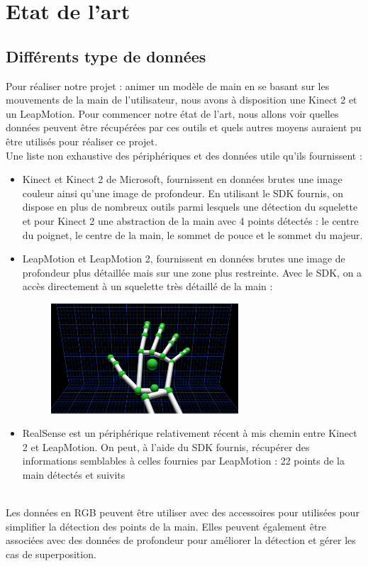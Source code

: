 \chapter{Etat de l'art}

\section{Différents type de données}
Pour réaliser notre projet : animer un modèle de main en se basant sur les mouvements de la main de l'utilisateur, nous avons à disposition une 
Kinect 2 et un LeapMotion. Pour commencer notre état de l'art, nous allons voir quelles données peuvent être récupérées par ces outils et 
quels autres moyens auraient pu être utilisés pour réaliser ce projet.\\

Une liste non exhaustive des périphériques et des données utile qu'ils fournissent : 
\begin{itemize}
  \item Kinect et Kinect 2 de Microsoft, fournissent en données brutes une image couleur ainsi qu'une image de profondeur. 
En utilisant le SDK fournis, on dispose en plus de nombreux outils parmi lesquels une détection du squelette et pour Kinect 2 
une abstraction de la main avec 4 points détectés : le centre du poignet, le centre de la main, le sommet de pouce et le sommet du majeur. 
  \item LeapMotion et LeapMotion 2, fournissent en données brutes une image de profondeur plus détaillée mais sur une zone 
plus restreinte. Avec le SDK, on a accès directement à un squelette très détaillé de la main :
    \begin{figure}[!h]
    \center
    \includegraphics[width=7cm]{images/SDK_LeapMotion.png}
    \end{figure}
  \item RealSense est un périphérique relativement récent à mis chemin entre Kinect 2 et LeapMotion. On peut, à l'aide du SDK fournis, récupérer des informations semblables à celles fournies par LeapMotion : 
  22 points de la main détectés et suivits
\end{itemize}
\ \\
Les données en RGB peuvent être utiliser avec des accessoires pour utilisées pour simplifier la détection des points de la main. \cite{wang2009real} 
Elles peuvent également être associées avec des données de profondeur pour améliorer la détection et gérer les cas de superposition. \cite{van2011combining}

